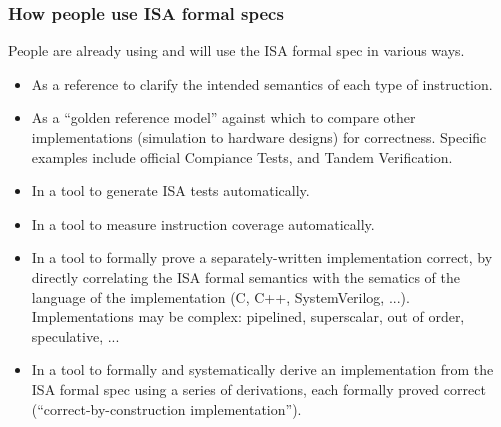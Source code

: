 \documentclass[aspectratio=169]{beamer}
\newcommand{\slidefont}{\scriptsize}
\begin{document}
\begin{frame}[fragile]
  \frametitle{How people use ISA formal specs}

  \slidefont

  People are already using and will use the ISA formal spec in various ways.

  \begin{itemize}
    \item As a reference to clarify the intended semantics of each type of instruction.

    \item As a ``golden reference model'' against which to compare
      other implementations (simulation to hardware designs) for
      correctness.  Specific examples include official Compiance
      Tests, and Tandem Verification.

    \item In a tool to generate ISA tests automatically.

    \item In a tool to measure instruction coverage automatically.

    \item In a tool to formally prove a separately-written
      implementation correct, by directly correlating the ISA formal
      semantics with the sematics of the language of the
      implementation (C, C++, SystemVerilog, ...).  Implementations
      may be complex: pipelined, superscalar, out of order,
      speculative, ...

    \item In a tool to formally and systematically derive an
      implementation from the ISA formal spec using a series of
      derivations, each formally proved correct
      (``correct-by-construction implementation'').

  \end{itemize}

\end{frame}

\end{document}

